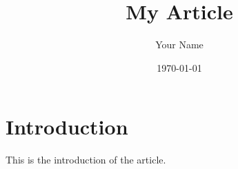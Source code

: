 \documentclass{article}
\title{My Article}
\author{Your Name}
\date{\today}
\begin{document}
\maketitle

\section{Introduction}

This is the introduction of the article.
\end{document}
